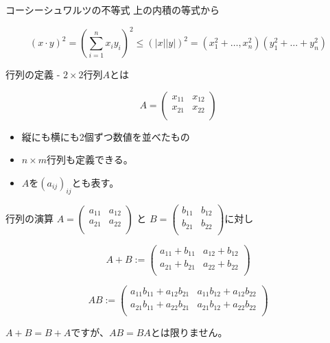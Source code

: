 \begin{frame}{コーシーシュワルツの不等式}
上の内積の等式から

\begin{equation*}
(x \cdot y)^2 = (\sum_{i=1}^n x_iy_i)^2 \le (|x||y|)^2 = (x_1^2 + \ldots, x_n^2)(y_1^2 + \ldots + y_n^2)
\end{equation*}

\end{frame}


\begin{frame}{行列の定義}
- $2 \times 2$行列$A$とは

\begin{equation*}
A = \left(
  \begin{array}{ll}
  x_{11} & x_{12} \\
  x_{21} & x_{22} \\
  \end{array}
  \right)
\end{equation*}

\begin{itemize}
\item 縦にも横にも2個ずつ数値を並べたもの
\item $n \times m$行列も定義できる。
\item $A$を$(a_{ij})_{ij}$とも表す。
\end{itemize}
\end{frame}


\begin{frame}{行列の演算}
$A = \left(
\begin{array}{ll}
a_{11} & a_{12} \\
a_{21} & a_{22} \\
\end{array}
\right)$ と $B = \left(
\begin{array}{ll}
b_{11} & b_{12} \\
b_{21} & b_{22} \\
\end{array}
\right)$に対し

\begin{equation*}
A + B := \left(
\begin{array}{ll}
a_{11} + b_{11} & a_{12} + b_{12} \\
a_{21} + b_{21} & a_{22} + b_{22} \\
\end{array}
\right)
\end{equation*}

\begin{equation*}
A B := \left(
\begin{array}{ll}
a_{11}b_{11} + a_{12}b_{21} & a_{11}b_{12} + a_{12}b_{22} \\
a_{21}b_{11} + a_{22}b_{21} & a_{21}b_{12} + a_{22}b_{22} \\
\end{array}
\right)
\end{equation*}

$A + B = B + A$ですが、$AB = BA$とは限りません。
\end{frame}


